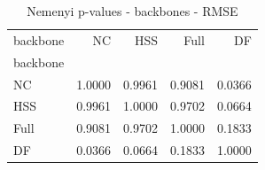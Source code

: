 \begin{table}
\caption{Nemenyi p-values - backbones - RMSE}
\label{tab:nemenyi_backbones_rmse}
\begin{tabular}{lrrrr}
\toprule
backbone & NC & HSS & Full & DF \\
backbone &  &  &  &  \\
\midrule
NC & 1.0000 & 0.9961 & 0.9081 & 0.0366 \\
HSS & 0.9961 & 1.0000 & 0.9702 & 0.0664 \\
Full & 0.9081 & 0.9702 & 1.0000 & 0.1833 \\
DF & 0.0366 & 0.0664 & 0.1833 & 1.0000 \\
\bottomrule
\end{tabular}
\end{table}
